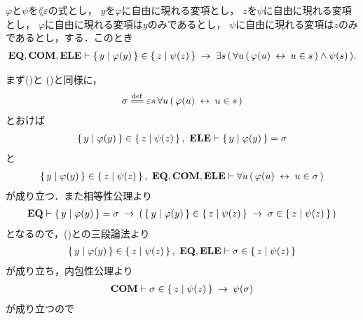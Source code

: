 	\begin{screen}
		\begin{thm}
		\label{thm:equivalent_formula_rewriting_11}
			$\varphi$と$\psi$を$\lang{\varepsilon}$の式とし，
			$y$を$\varphi$に自由に現れる変項とし，
			$z$を$\psi$に自由に現れる変項とし，
			$\varphi$に自由に現れる変項は$y$のみであるとし，
			$\psi$に自由に現れる変項は$z$のみであるとし，する．このとき
			\begin{align}
				\mbox{{\bf EQ}},\mbox{\bf COM},\mbox{{\bf ELE}} \vdash \left\{\, y \mid \varphi(y)\, \right\} \in \left\{\, z \mid \psi(z)\, \right\}
				\hspace{0.25em}\rightarrow\hspace{0.25em} \exists s\, (\, 
				\forall u\, (\, \varphi(u) \hspace{0.25em}\leftrightarrow\hspace{0.25em} u \in s\, )
				\wedge \psi(s)\, ).
			\end{align}
		\end{thm}
	\end{screen}
	
	\begin{sketch}
		まず()と
		()と同様に，
		\begin{align}
			\sigma \defeq 
			\varepsilon s\, \forall u\, (\, \varphi(u) \lrarrow u \in s\, )
		\end{align}
		とおけば
		\begin{align}
			\left\{\, y \mid \varphi(y)\, \right\} \in \left\{\, z \mid \psi(z)\, \right\},\ \mbox{{\bf ELE}} \vdash 
			\left\{\, y \mid \varphi(y)\, \right\} = \sigma
			\label{fom:equivalent_formula_rewriting_11_1}
		\end{align}
		と
		\begin{align}
			\Set{y}{\varphi(y)} \in \Set{z}{\psi(z)},\ \EQAX,\COMAX,\ELEAX \vdash
			\forall u\, (\, \varphi(u) \lrarrow u \in \sigma\, )
			\label{fom:equivalent_formula_rewriting_11_2}
		\end{align}
		が成り立つ．また相等性公理より
		\begin{align}
			\mbox{{\bf EQ}} \vdash \left\{\, y \mid \varphi(y)\, \right\} = \sigma
			\hspace{0.25em}\rightarrow\hspace{0.25em} (\, \left\{\, y \mid \varphi(y)\, \right\} \in \left\{\, z \mid \psi(z)\, \right\}
			\hspace{0.25em}\rightarrow\hspace{0.25em} \sigma \in \left\{\, z \mid \psi(z)\, \right\}\, )
		\end{align}
		となるので，()との三段論法より
		\begin{align}
			\left\{\, y \mid \varphi(y)\, \right\} \in \left\{\, z \mid \psi(z)\, \right\},\ \mbox{{\bf EQ}},\mbox{{\bf ELE}} \vdash 
			\sigma \in \left\{\, z \mid \psi(z)\, \right\}
		\end{align}
		が成り立ち，内包性公理より
		\begin{align}
			\mbox{\bf COM} \vdash \sigma \in \left\{\, z \mid \psi(z)\, \right\} \hspace{0.25em}\rightarrow\hspace{0.25em} \psi(\sigma)
		\end{align}
		が成り立つので
		\begin{align}

\end{align}
\end{sketch}

